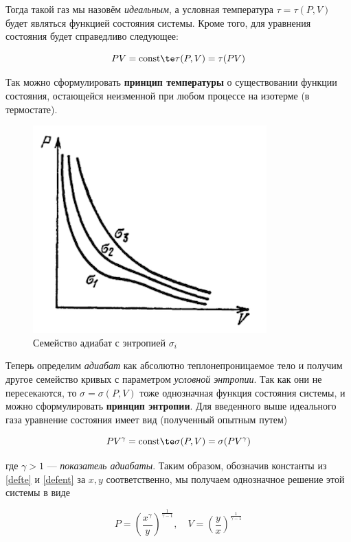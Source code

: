 \documentclass[12pt]{kiarticle}
\newcommand{\co}{\ensuremath{\mathrm{const}}}
\begin{document}
Тогда такой газ мы назовём \textit{идеальным}, а условная температура $ \tau = \tau (P, V) $ будет являться функцией состояния системы. Кроме того, для уравнения состояния будет справедливо следующее:

\begin{equation}\label{defte}
PV = \co \te \tau (P, V) = \tau (PV)
\end{equation}

Так можно сформулировать \textbf{принцип температуры} о существовании функции состояния, остающейся неизменной при любом процессе на изотерме (в термостате).

\begin{figure} 
	\includegraphics{entdef}
	\caption{Семейство адиабат с энтропией $ \sigma_i $}
\end{figure}

Теперь определим \textit{адиабат} как абсолютно теплонепроницаемое тело и получим другое семейство кривых с параметром \textit{условной энтропии}. Так как они не пересекаются, то $ \sigma = \sigma (P, V) $ тоже однозначная функция состояния системы, и можно сформулировать \textbf{принцип энтропии}. Для введенного выше идеального газа  уравнение состояния имеет вид (полученный опытным путем)

\begin{equation}\label{defent}
PV^\gamma = \co \te \sigma (P, V) = \sigma (PV^\gamma)
\end{equation}

где $ \gamma > 1 $ --- \textit{показатель адиабаты}. Таким образом, обозначив константы из \eqref{defte} и \eqref{defent} за $ x, y $ соответственно, мы получаем однозначное решение этой системы в виде

\begin{equation}\label{xy}
P = \left( \dfrac{x^\gamma}{y} \right)^\frac{1}{\gamma -1}, \quad V = \left (\dfrac{y}{x} \right )^\frac{1}{\gamma -1} 
\end{equation}
\end{document}
